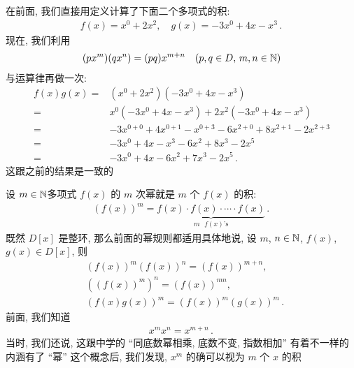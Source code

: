 \begin{example}
    在前面, 我们直接用定义计算了下面二个多项式的积:
    \begin{align*}
        f(x) = x^0 + 2x^2, \quad g(x) = -3x^0 + 4x - x^3 \period
    \end{align*}
    现在, 我们利用
    \begin{align*}
        (px^m) (qx^n) = (pq) x^{m+n} \quad (p,q \in D, \, m,n \in \mathbb{N})
    \end{align*}
    与运算律再做一次:
    \begin{align*}
        f(x) g(x)
        = {} & (x^0 + 2x^2) (-3x^0 + 4x - x^3)                                 \\
        = {} & x^0 (-3x^0 + 4x - x^3) + 2x^2 (-3x^0 + 4x - x^3)                \\
        = {} & -3x^{0+0} + 4x^{0+1} - x^{0+3} - 6x^{2+0} + 8x^{2+1} - 2x^{2+3} \\
        = {} & -3x^0 + 4x - x^3 - 6x^2 + 8x^3 - 2x^5                           \\
        = {} & -3x^0 + 4x - 6x^2 + 7x^3 - 2x^5 \period
    \end{align*}
    这跟之前的结果是一致的\period
\end{example}

\begin{definition}
    设 $m \in \mathbb{N}$\period 多项式 $f(x)$ 的 $m$ 次幂就是 $m$ 个 $f(x)$ 的积:
    \begin{align*}
        (f(x))^m = \underbrace{f(x) \cdot f(x) \cdot \cdots \cdot f(x)}_{\text{$m$ $f(x)$'s}} \period
    \end{align*}
    既然 $D[x]$ 是整环, 那么前面的幂规则都适用\period 具体地说, 设 $m$, $n \in \mathbb{N}$, $f(x)$, $g(x) \in D[x]$, 则
    \begin{align*}
         & (f(x))^m (f(x))^n = (f(x))^{m+n},         \\
         & ((f(x))^m)^n = (f(x))^{mn},               \\
         & (f(x) g(x))^m = (f(x))^m (g(x))^m \period
    \end{align*}
    前面, 我们知道
    \begin{align*}
        x^m x^n = x^{m+n} \period
    \end{align*}
    当时, 我们还说, 这跟中学的 ``同底数幂相乘, 底数不变, 指数相加'' 有着不一样的内涵\period 有了 ``幂'' 这个概念后, 我们发现, $x^m$ 的确可以视为 $m$ 个 $x$ 的积\period
\end{definition}

